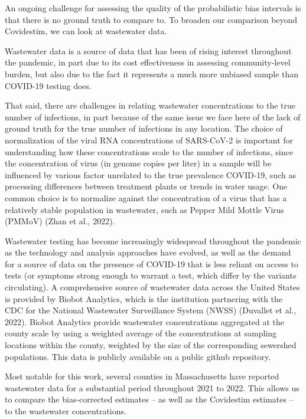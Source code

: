 \documentclass[12pt,twoside]{smiththesis}
\begin{document}
An ongoing challenge for assessing the quality of the probabilistic bias intervals is that there is no ground truth to compare to. To broaden our comparison beyond Covidestim, we can look at wastewater data.

Wastewater data is a source of data that has been of rising interest throughout the pandemic, in part due to its cost effectiveness in assessing community-level burden, but also due to the fact it represents a much more unbiased sample than COVID-19 testing does.

That said, there are challenges in relating wastewater concentrations to the true number of infections, in part because of the same issue we face here of the lack of ground truth for the true number of infections in any location. The choice of normalization of the viral RNA concentrations of SARS-CoV-2 is important for understanding how these concentrations scale to the number of infections, since the concentration of virus (in genome copies per liter) in a sample will be influenced by various factor unrelated to the true prevalence COVID-19, such as processing differences between treatment plants or trends in water usage. One common choice is to normalize against the concentration of a virus that has a relatively stable population in wastewater, such as Pepper Mild Mottle Virus (PMMoV) (Zhan et al., 2022).

Wastewater testing has become increasingly widespread throughout the pandemic as the technology and analysis approaches have evolved, as well as the demand for a source of data on the presence of COVID-19 that is less reliant on access to tests (or symptoms strong enough to warrant a test, which differ by the variants circulating). A comprehensive source of wastewater data across the United States is provided by Biobot Analytics, which is the institution partnering with the CDC for the National Wastewater Surveillance System (NWSS) (Duvallet et al., 2022). Biobot Analytics provide wastewater concentrations aggregated at the county scale by using a weighted average of the concentrations at sampling locations within the county, weighted by the size of the corresponding sewershed populations. This data is publicly available on a public github repository.

Most notable for this work, several counties in Massachusetts have reported wastewater data for a substantial period throughout 2021 to 2022. This allows us to compare the bias-corrected estimates -- as well as the Covidestim estimates -- to the wastewater concentrations.
\end{document}
